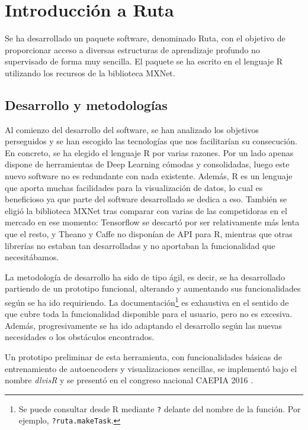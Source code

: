 \section{Introducción a Ruta}\label{el-paquete-ruta}

Se ha desarrollado un paquete software, denominado Ruta, con el
objetivo de proporcionar acceso a diversas estructuras de aprendizaje profundo no supervisado de forma muy sencilla. El paquete se ha escrito en el lenguaje R utilizando los recursos de la biblioteca MXNet.

\subsection{Desarrollo y metodologías}\label{metodologuxeda-de-desarrollo}

Al comienzo del desarrollo del software, se han analizado los objetivos perseguidos y se han escogido las tecnologías que nos facilitarían su consecución. En concreto, se ha elegido el lenguaje R por varias razones. Por un lado apenas dispone de herramientas de Deep Learning cómodas y consolidadas, luego este nuevo software no es redundante con nada existente. Además, R es un lenguaje que aporta muchas facilidades para la visualización de datos, lo cual es beneficioso ya que parte del software desarrollado se dedica a eso. También se eligió la biblioteca MXNet tras comparar con varias de las competidoras en el mercado en ese momento: Tensorflow se descartó por ser relativamente más lenta que el resto, y Theano y Caffe no disponían de API para R, mientras que otras librerías no estaban tan desarrolladas y no aportaban la funcionalidad que necesitábamos.

La metodología de desarrollo ha sido de tipo ágil, es decir, se ha desarrollado partiendo de un prototipo funcional, alterando y aumentando sus funcionalidades según se ha ido requiriendo. La documentación\footnote{Se puede consultar desde R mediante \texttt{?} delante del nombre de la función. Por ejemplo, \texttt{?ruta.makeTask}.} es exhaustiva en el sentido de que cubre toda la funcionalidad disponible para el usuario, pero no es excesiva. Además, progresivamente se ha ido adaptando el desarrollo según las nuevas necesidades o los obstáculos encontrados.

Un prototipo preliminar de esta herramienta, con funcionalidades básicas de entrenamiento de autoencoders y visualizaciones sencillas, se implementó bajo el nombre \emph{dlvisR} y se presentó en el congreso nacional CAEPIA 2016 \autocite{charte2016dlvisr}.

